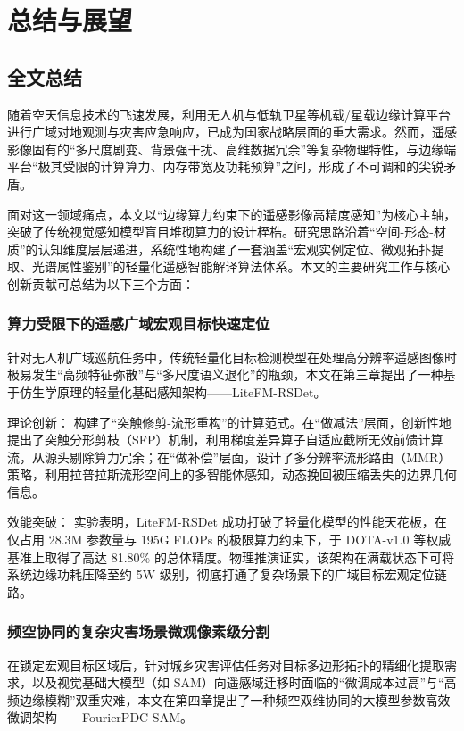 \chapter{总结与展望}

\section{全文总结}
随着空天信息技术的飞速发展，利用无人机与低轨卫星等机载/星载边缘计算平台进行广域对地观测与灾害应急响应，已成为国家战略层面的重大需求。然而，遥感影像固有的“多尺度剧变、背景强干扰、高维数据冗余”等复杂物理特性，与边缘端平台“极其受限的计算算力、内存带宽及功耗预算”之间，形成了不可调和的尖锐矛盾。

面对这一领域痛点，本文以“边缘算力约束下的遥感影像高精度感知”为核心主轴，突破了传统视觉感知模型盲目堆砌算力的设计桎梏。研究思路沿着“空间-形态-材质”的认知维度层层递进，系统性地构建了一套涵盖“宏观实例定位、微观拓扑提取、光谱属性鉴别”的轻量化遥感智能解译算法体系。本文的主要研究工作与核心创新贡献可总结为以下三个方面：

\subsection{算力受限下的遥感广域宏观目标快速定位}
针对无人机广域巡航任务中，传统轻量化目标检测模型在处理高分辨率遥感图像时极易发生“高频特征弥散”与“多尺度语义退化”的瓶颈，本文在第三章提出了一种基于仿生学原理的轻量化基础感知架构——LiteFM-RSDet。

理论创新： 构建了“突触修剪-流形重构”的计算范式。在“做减法”层面，创新性地提出了突触分形剪枝（SFP）机制，利用梯度差异算子自适应截断无效前馈计算流，从源头剔除算力冗余；在“做补偿”层面，设计了多分辨率流形路由（MMR）策略，利用拉普拉斯流形空间上的多智能体感知，动态挽回被压缩丢失的边界几何信息。

效能突破： 实验表明，LiteFM-RSDet 成功打破了轻量化模型的性能天花板，在仅占用 28.3M 参数量与 195G FLOPs 的极限算力约束下，于 DOTA-v1.0 等权威基准上取得了高达 81.80\% 的总体精度。物理推演证实，该架构在满载状态下可将系统边缘功耗压降至约 5W 级别，彻底打通了复杂场景下的广域目标宏观定位链路。

\subsection{频空协同的复杂灾害场景微观像素级分割}
在锁定宏观目标区域后，针对城乡灾害评估任务对目标多边形拓扑的精细化提取需求，以及视觉基础大模型（如 SAM）向遥感域迁移时面临的“微调成本过高”与“高频边缘模糊”双重灾难，本文在第四章提出了一种频空双维协同的大模型参数高效微调架构——FourierPDC-SAM。

